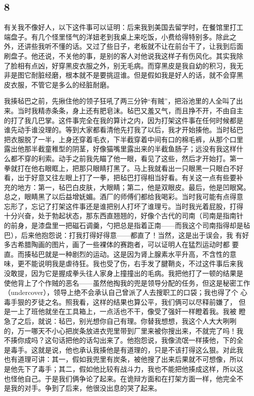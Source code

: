 \subsection{8} 

有关我不像好人，以下这件事可以证明：后来我到美国去留学时，在餐馆里打工
端盘子。有几个怪里怪气的洋妞老到我桌上来吃饭，小费给得特别多。除此之
外，还讲些我听不懂的话。又过了些日子，老板就不让在前台干了，让我到后面
刷盘子。他还说，不关他的事，是别的客人对他说我这样子有伤风化。其实我除
了脸相有点凶，好穿黑皮衣服之外，别无毛病。而穿黑皮是我自幼的积习，我无
非是图它耐脏经磨，根本就不是要挑逗谁。但是假如我是好人的话，就不会穿黑
皮衣服，不管它是多么的经脏耐磨。

我揍毡巴之前，先揪住他的领子狂吼了两三分钟“有贼”，把浴池里的人全叫了出
来。当时我精赤条条，身上还有肥皂沫。毡巴又羞又气，而且挣不开，不由自主
的打了我几巴掌。这件事完全在我的算计之内，因为打架这件事在任何时候都是
谁先动手谁没理的。等到大家都看清他先打我了以后，我才开始揍他。当时毡巴
把衣服脱了一半，上身还穿着毛衣，下半截穿着中间有口的棉毛裤，从那个口里
露出他那半截童稚型的阴茎，好像猫嘴里露出来的半截鱼肠子；远没有我这样什
么都不穿的利索。动手之前我先瞄了他一眼，看见了这些，然后才开始打。第一
拳就打在他右眼眶上，把那只眼睛打黑了。马上我就看出一只眼黑一只眼白不好
看，出于好意又往左眼上打了一拳，把毡巴打得相当好看。有关这一点有些要补
充的地方：第一，毡巴白皮肤，大眼睛；第二，他是双眼皮。最后，他是凹眼窝。
总之，眼睛黑了以后益增妩媚。酒厂的师傅们都给我喝彩。当时我可能有点得意
忘形了，忘记了打架这件事还是谁把别人打坏了谁理亏。当时我光着屁股，打得
十分兴奋，处于勃起状态，那东西直翘翘的，好像个古代的司南（司南是指南针
的前身，是漆盘里一把磁石调羹，勺把总是指着正南——而我这个司南指得却是毡巴），后来他抱怨说：打我打得好得意——都直了！当然，这是出于误会，我
有好多古希腊陶画的图片，画了一些裸体的赛跑者，可以证明人在猛烈运动时都
要直。而揍毡巴就是一种剧烈的运动。这是因为肾上腺素水平升高，不含性的意
味，更不能说明我是虐待狂。我也受了伤，右手发了腱鞘炎，不过这件事后来我
没敢提，因为它是握成拳头往人家身上撞撞出的毛病。我把他打了一顿的结果是
使他背上了个作贼的恶名——虽然他掏我的兜是领导分配的任务，但这是秘密工作
（undercover），领导上绝不会承认自己曾派了人去搜职工的口袋；我也得了个
心毒手狠的歹徒之名。照我看，这样的结果也算公平，我们俩可以尽释前嫌了，
但是一上了班他就坐在工具箱上，一点活也不干，像受了强奸一样瞪着我。我被
瞪急了之后，就说：毡巴，别光想你自己有理。你替我想想，我这个人大大咧咧
的，万一哪天不小心把炭条放进衣兜里带到厂里来被你搜出来，不就完了吗！我
不揍你成吗？这句话把他的话勾出来了。他抱怨说，我像流氓一样揍他，下的全
是毒手。这就是说，他也承认我揍他是有道理的，只是不该打得这么狠。对此我
也有道理可讲：其一，假如我兜里有炭条，被他搜了出来后果就不可想像，所以
是他先下了毒手；其二，假如他比较有战斗力，我也不能把他揍成这样，所以这
也怪他自己。于是我们俩争论了起来。在诡辩方面和在打架方面一样，他完全不
是我的对手。争到了后来，他很没出息的哭了起来。

